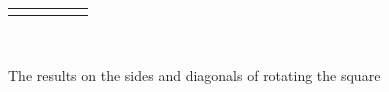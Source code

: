 \documentclass[10pt,]{book}
\theoremstyle{plain}
\theoremstyle{definition}
\theoremstyle{definition}
\numberwithin{equation}{chapter}
\newlength{\panelmax}
\begin{document}
\begin{figure}
{\begin{tabular}{@{}*{5}{c}@{}}
\begin{minipage}[c][\panelmax][t]{0.19\linewidth}\usebox{\panelboxAGimage}\end{minipage}&
\begin{minipage}[c][\panelmax][t]{0.19\linewidth}\usebox{\panelboxAHimage}\end{minipage}&
\begin{minipage}[c][\panelmax][t]{0.19\linewidth}\usebox{\panelboxAIimage}\end{minipage}&
\begin{minipage}[c][\panelmax][t]{0.19\linewidth}\usebox{\panelboxAJimage}\end{minipage}&
\begin{minipage}[c][\panelmax][t]{0.19\linewidth}\usebox{\panelboxAKimage}\end{minipage}\end{tabular}\\
}%
\caption{The results on the sides and diagonals of rotating the square\label{rotate-square}}
\end{figure}
\end{document}
